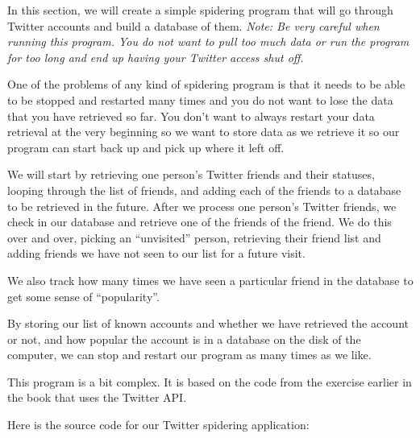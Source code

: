 \documentclass[11pt]{book}
\begin{document}
In this section, we will create a simple spidering program that will 
go through Twitter accounts and build a database of them.
\emph{Note: Be very careful when running this program.  You do not
want to pull too much data or run the program for too long and
end up having your Twitter access shut off.}

One of the problems of any kind of spidering program is that it 
needs to be able to be stopped and restarted many times and 
you do not want to lose the data that you have retrieved so far.
You don't want to always restart your data retrieval at the
very beginning so we want to store data as we retrieve it so our
program can start back up and pick up where it left off.

We will start by retrieving one person's Twitter friends and their
statuses, looping through the list of friends, and adding each 
of the friends to a database to be retrieved in the future.  After
we process one person's Twitter friends, we check in our database
and retrieve one of the friends of the friend.  We do this over and
over, picking an ``unvisited'' person, retrieving their friend list
and adding friends we have not seen to our list for a future visit.

We also track how many times we have seen a particular friend in the
database to get some sense of ``popularity''.

By storing our list of known accounts and whether 
we have retrieved the account or not, 
and how popular the account is in a database on the disk
of the computer, we can stop and
restart our program as many times as we like.

This program is a bit complex. It is based on the code 
from the exercise earlier in the book that uses
the Twitter API.

Here is the source code for our Twitter spidering application:
\end{document}

